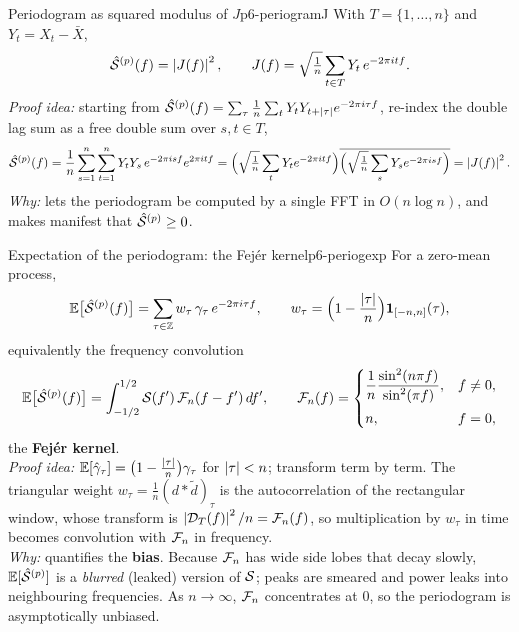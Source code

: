 \begin{proposition}{Periodogram as squared modulus of $J$}{p6-periogramJ}
With $T=\{1,\dots,n\}$ and $Y_t=X_t-\bar X$,
\[
\hat{\mathcal{S}}^{(p)}(f)=\left\lvert J(f) \right\rvert^2,\qquad
J(f)=\sqrt{\tfrac1n}\sum_{t\in T} Y_t\,e^{-2\pi i t f}.
\]
\textit{Proof idea:} starting from
$\hat{\mathcal{S}}^{(p)}(f)=\sum_{\tau}\frac1n\sum_t Y_tY_{t+\left\lvert \tau \right\rvert}e^{-2\pi i\tau f}$,
re-index the double lag sum as a free double sum over $s,t\in T$,
\[
\hat{\mathcal{S}}^{(p)}(f)=\frac1n\sum_{s=1}^{n}\sum_{t=1}^{n}
Y_tY_s\,e^{-2\pi i s f}e^{2\pi i t f}
=\Big(\sqrt{\tfrac1n}\sum_t Y_t e^{-2\pi i t f}\Big)
\overline{\Big(\sqrt{\tfrac1n}\sum_s Y_s e^{-2\pi i s f}\Big)}
=\left\lvert J(f) \right\rvert^2 .
\]
\textit{Why:} lets the periodogram be computed by a single FFT in
$O(n\log n)$, and makes manifest that $\hat{\mathcal{S}}^{(p)}\ge0$.
\end{proposition}

\begin{theorem}{Expectation of the periodogram: the Fej\'er kernel}{p6-periogexp}
For a zero-mean process,
\[
\mathbb{E}\big[\hat{\mathcal{S}}^{(p)}(f)\big]
=\sum_{\tau\in\mathbb{Z}} w_\tau\,\gamma_\tau\,e^{-2\pi i\tau f},\qquad
w_\tau=\Big(1-\frac{\left\lvert \tau \right\rvert}{n}\Big)\mathbf{1}_{[-n,n]}(\tau),
\]
equivalently the frequency convolution
\[
\mathbb{E}\big[\hat{\mathcal{S}}^{(p)}(f)\big]=\int_{-1/2}^{1/2}\mathcal{S}(f')\,\mathcal{F}_n(f-f')\,df',
\qquad
\mathcal{F}_n(f)=
\begin{cases}
\dfrac1n\dfrac{\sin^2(n\pi f)}{\sin^2(\pi f)}, & f\ne0,\\[2.2ex]
n, & f=0,
\end{cases}
\]
the \textbf{Fej\'er kernel}.\\[2pt]
\textit{Proof idea:} $\mathbb{E}[\hat{\gamma}_\tau]=\big(1-\tfrac{\left\lvert \tau \right\rvert}{n}\big)\gamma_\tau$
for $\left\lvert \tau \right\rvert<n$; transform term by term. The triangular weight
$w_\tau=\tfrac1n(d*\tilde d)_\tau$ is the autocorrelation of the rectangular
window, whose transform is $\left\lvert \mathcal{D}_T(f) \right\rvert^2/n=\mathcal{F}_n(f)$, so multiplication by
$w_\tau$ in time becomes convolution with $\mathcal{F}_n$ in frequency.\\
\textit{Why:} quantifies the \textbf{bias}. Because $\mathcal{F}_n$ has wide side
lobes that decay slowly, $\mathbb{E}[\hat{\mathcal{S}}^{(p)}]$ is a \emph{blurred} (leaked)
version of $\mathcal{S}$; peaks are smeared and power leaks into neighbouring
frequencies. As $n\to\infty$, $\mathcal{F}_n$ concentrates at $0$, so the periodogram
is asymptotically unbiased.
\end{theorem}

